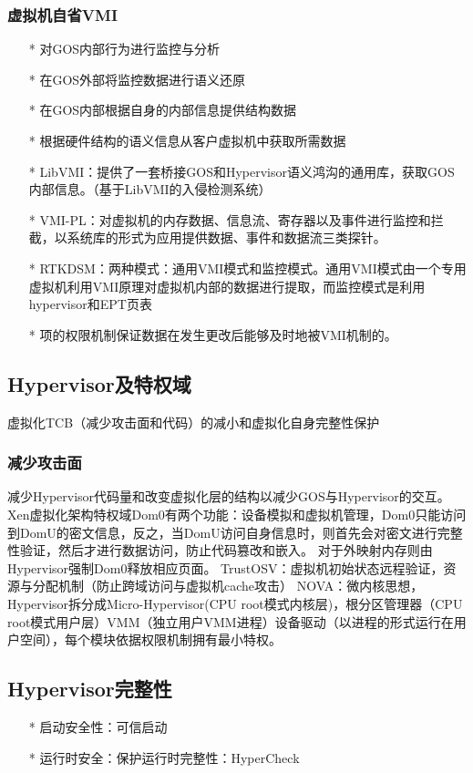 \documentclass[UTF8]{ctexart}
\begin{document}
	\subsubsection{虚拟机自省VMI} 
	\begin{itemize}
	\item[*] 对GOS内部行为进行监控与分析
	\item[*] 在GOS外部将监控数据进行语义还原
	\item[*] 在GOS内部根据自身的内部信息提供结构数据
	\item[*] 根据硬件结构的语义信息从客户虚拟机中获取所需数据

	\item[*] LibVMI：提供了一套桥接GOS和Hypervisor语义鸿沟的通用库，获取GOS内部信息。（基于LibVMI的入侵检测系统）
	\item[*] VMI-PL：对虚拟机的内存数据、信息流、寄存器以及事件进行监控和拦截，以系统库的形式为应用提供数据、事件和数据流三类探针。
	\item[*] RTKDSM：两种模式：通用VMI模式和监控模式。通用VMI模式由一个专用虚拟机利用VMI原理对虚拟机内部的数据进行提取，而监控模式是利用hypervisor和EPT页表\item[*] 项的权限机制保证数据在发生更改后能够及时地被VMI机制的。
	\end{itemize}

	\subsection{Hypervisor及特权域}
	虚拟化TCB（减少攻击面和代码）的减小和虚拟化自身完整性保护
	\subsubsection{减少攻击面} 
	
	减少Hypervisor代码量和改变虚拟化层的结构以减少GOS与Hypervisor的交互。
	Xen虚拟化架构特权域Dom0有两个功能：设备模拟和虚拟机管理，Dom0只能访问到DomU的密文信息，反之，当DomU访问自身信息时，则首先会对密文进行完整性验证，然后才进行数据访问，防止代码篡改和嵌入。 对于外映射内存则由Hypervisor强制Dom0释放相应页面。
	TrustOSV：虚拟机初始状态远程验证，资源与分配机制（防止跨域访问与虚拟机cache攻击）
	NOVA：微内核思想，Hypervisor拆分成Micro-Hypervisor(CPU root模式内核层)，根分区管理器（CPU root模式用户层）VMM（独立用户VMM进程）设备驱动（以进程的形式运行在用户空间），每个模块依据权限机制拥有最小特权。

	\subsection{Hypervisor完整性}
	\begin{itemize}
	\item[*] 启动安全性：可信启动
	\item[*] 运行时安全：保护运行时完整性：HyperCheck
	\end{itemize}
\end{document}
